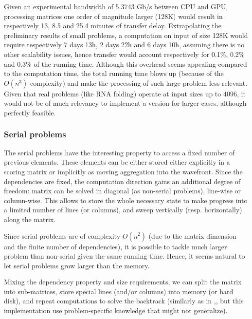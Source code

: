 Given an experimental bandwidth of 5.3743 Gb/s between CPU and GPU, processing matrices one order of magnitude larger (128K) would result in respectively 13, 8.5 and 25.4 minutes of transfer delay. Extrapolating the preliminary results of small problems, a computation on input of size 128K would require respectively 7 days 13h, 2 days 22h and 6 days 10h, assuming there is no other scalability issues, hence transfer would account respectively for 0.1\%, 0.2\% and 0.3\% of the running time. Although this overhead seems appealing compared to the computation time, the total running time blows up (because of the  $O(n^3)$ complexity) and make the processing of such large problem less relevant. Given that real problems (like RNA folding) operate at input sizes up to 4096, it would not be of much relevancy to implement a version for larger cases, although perfectly feasible.

\subsubsection{Serial problems} \label{serial_memory}
The serial problems have the interesting property to access a fixed number of previous elements. These elements can be either stored either explicitly in a scoring matrix or implicitly as moving aggregation into the wavefront. Since the dependencies are fixed, the computation direction gains an additional degree of freedom: matrix can be solved in diagonal (as non-serial problems), line-wise or column-wise. This allows to store the whole necessary state to make progress into a limited number of lines (or columns), and sweep vertically (resp. horizontally) along the matrix.

Since serial problems are of complexity $O(n^2)$ (due to the matrix dimension and the finite number of dependencies), it is possible to tackle much larger problem than non-serial given the same running time. Hence, it seems natural to let serial problems grow larger than the memory.

Mixing the dependency property and size requirements, we can split the matrix into sub-matrices, store special lines (and/or columns) into memory (or hard disk), and repeat computations to solve the backtrack (similarly as in \cite{swat_gpu},\cite{swat_mega}, but this implementation use problem-specific knowledge that might not generalize).

